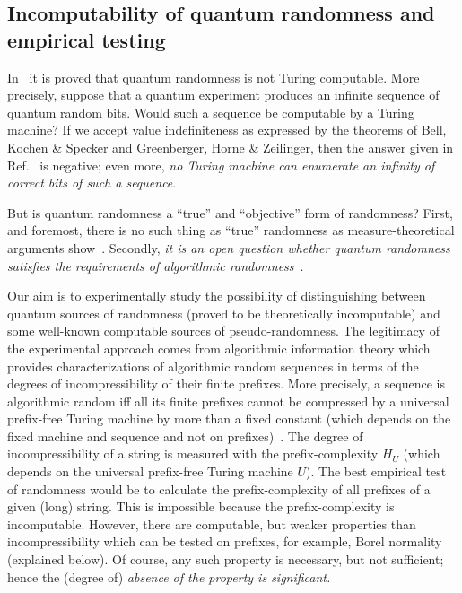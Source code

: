 \documentclass[10pt]{article}%
\begin{document}
\subsection{Incomputability of quantum randomness and empirical testing}
\label{incomput}

\fi

In~\cite{2008-cal-svo} it is proved that quantum randomness is not Turing computable.
More precisely, suppose that a quantum experiment produces an infinite sequence of quantum random bits.
Would such a sequence be computable by a Turing machine?
If we accept value indefiniteness as expressed by the theorems of Bell, Kochen \& Specker and Greenberger, Horne \& Zeilinger,
then the answer given in Ref.~\cite{2008-cal-svo} is negative;
even more, {\it no Turing machine can enumerate an infinity of correct bits of such a sequence}.



But is quantum randomness a ``true'' and ``objective'' form of randomness?
First, and foremost, there is no such thing as ``true'' randomness as measure-theoretical arguments show~\cite{calude:02}.
Secondly, {\it  it is an open question  whether quantum randomness satisfies the
requirements of algorithmic randomness}~\cite{calude:02}.



Our aim is to experimentally study the possibility of distinguishing between
quantum sources of randomness (proved to be theoretically incomputable) and  some well-known computable
sources of  pseudo-randomness.
 The  legitimacy of the experimental approach comes from algorithmic information theory
which provides characterizations of algorithmic random sequences in terms of the degrees of incompressibility of their finite prefixes.
More precisely, a sequence is algorithmic random iff  all its finite prefixes cannot be compressed by a universal prefix-free Turing machine by more than a fixed constant
(which depends on the fixed machine and sequence and not on prefixes)~\cite{calude:02}.
The degree of incompressibility of a string is measured with the prefix-complexity $H_{U}$ (which depends on the universal prefix-free Turing machine
$U$). The best empirical test of randomness would be to calculate the prefix-complexity of all prefixes of  a given (long) string.
This is impossible because the prefix-complexity is incomputable.
However, there are computable, but weaker properties than incompressibility which can be tested on prefixes, for example, Borel normality (explained below).
Of course, any such property is necessary, but not sufficient; hence  the (degree of) {\it absence of the property is significant.}
\end{document}
